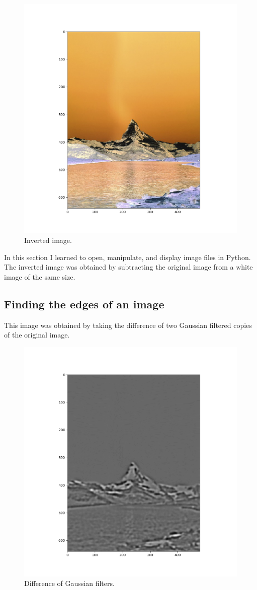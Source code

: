 \documentclass[11pt]{article}
\begin{document}
\begin{figure}[h]
\begin{minipage}{0.5 \textwidth}
		\includegraphics[width=1 \textwidth]{figures/inverted.png}
		\caption{Inverted image.}
\end{minipage}
\end{figure}
In this section I learned to open, manipulate, and display image files in Python.
The inverted image was obtained by subtracting the original image from a white image of the same size.


\subsection{Finding the edges of an image} %
This image was obtained by taking the difference of two Gaussian filtered copies of the original image.
\begin{figure}[h]
	\centering
	\includegraphics[width=0.6 \textwidth]{figures/edges.png}
	\caption{Difference of Gaussian filters.}
\end{figure}
\end{document}
